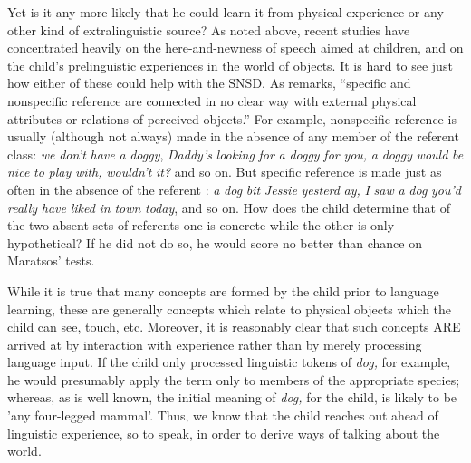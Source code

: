 Yet is it any more likely that he could learn it from physical
experience or any other kind of extralinguistic source? As noted above, recent studies have concentrated heavily on the here-and-newness of speech aimed at children, and on the child's prelinguistic experiences in the world of objects. It is hard to see just how either of these could help with the SNSD. As \citet[94]{Maratsos1976} remarks, ``specific and nonspecific reference are connected in no clear way with external physical attributes or relations of perceived objects.'' For example, nonspecific reference is usually (although not always) made in the absence of any member of the referent class: \textit{we} \textit{don't} \textit{have} \textit{a} \textit{dogg}\textit{y}, \textit{Dad}\textit{d}\textit{y's} \textit{looki}\textit{n}\textit{g} \textit{for} \textit{a} \textit{doggy} \textit{for} \textit{you,} \textit{a} \textit{doggy} \textit{would} \textit{be} \textit{nice} \textit{to} \textit{play} \textit{with,} \textit{wouldn't} \textit{it?} and so on. But specific reference is made just as often in the absence of the referent : \textit{a} \textit{dog} \textit{bit} \textit{Jessie} \textit{yesterd} \textit{ay,} \textit{I} \textit{saw} \textit{a} \textit{dog} \textit{you'd} \textit{really} \textit{have} \textit{liked} \textit{in} \textit{town} \textit{toda}\textit{y}, and so on. How does the child determine that of the two absent sets of referents one is concrete while the other is only hypothetical? If he did not do so, he would score no better than chance on Maratsos' tests.


While it is true that many concepts are formed by the child prior to language learning, these are generally concepts which relate to physical objects which the child can see, touch, etc. Moreover, it is reasonably clear that such concepts ARE arrived at by interaction with experience rather than by merely processing language input. If the child only processed linguistic tokens of \textit{dog,} for example, he would pre\-sumably apply the term only to members of the appropriate species; whereas, as is well known, the initial meaning of \textit{dog,} for the child, is likely to be 'any four-legged mammal'. Thus, we know that the child reaches out ahead of linguistic experience, so to speak, in order
to derive ways of talking about the world.

